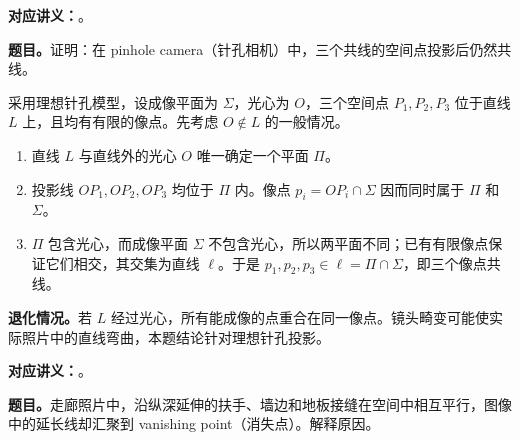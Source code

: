
\begingroup
\setlength{\parskip}{0.4em}
\label{tutorial:SC4061-TUT07}



\textbf{对应讲义：}。

\textbf{题目。}证明：在 pinhole camera（针孔相机）中，三个共线的空间点投影后仍然共线。

\begin{checkedsolution}
采用理想针孔模型，设成像平面为 $\Sigma$，光心为 $O$，三个空间点 $P_1,P_2,P_3$ 位于直线 $L$ 上，且均有有限的像点。先考虑 $O\notin L$ 的一般情况。

\begin{enumerate}[label=\arabic*.]
  \item 直线 $L$ 与直线外的光心 $O$ 唯一确定一个平面 $\Pi$。
  \item 投影线 $OP_1,OP_2,OP_3$ 均位于 $\Pi$ 内。像点 $p_i=OP_i\cap\Sigma$ 因而同时属于 $\Pi$ 和 $\Sigma$。
  \item $\Pi$ 包含光心，而成像平面 $\Sigma$ 不包含光心，所以两平面不同；已有有限像点保证它们相交，其交集为直线 $\ell$。于是 $\boxed{p_1,p_2,p_3\in\ell=\Pi\cap\Sigma}$，即三个像点共线。
\end{enumerate}

\textbf{退化情况。}若 $L$ 经过光心，所有能成像的点重合在同一像点。镜头畸变可能使实际照片中的直线弯曲，本题结论针对理想针孔投影。
\end{checkedsolution}


\textbf{对应讲义：}。

\textbf{题目。}走廊照片中，沿纵深延伸的扶手、墙边和地板接缝在空间中相互平行，图像中的延长线却汇聚到 vanishing point（消失点）。解释原因。

